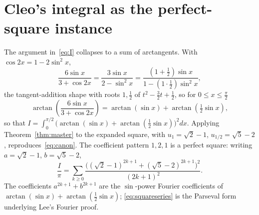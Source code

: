 \documentclass[11pt]{article}
\theoremstyle{plain}\newtheorem{theorem}{Theorem}\newtheorem{proposition}[theorem]{Proposition}
\theoremstyle{remark}\newtheorem{remark}[theorem]{Remark}
\begin{document}
\section{Cleo's integral as the perfect-square instance}\label{sec:square}
The argument in~\eqref{eq:I} collapses to a sum of arctangents. With $\cos2x=1-2\sin^2x$,
\[
  \frac{6\sin x}{3+\cos2x}=\frac{3\sin x}{2-\sin^2x}=\frac{(1+\tfrac12)\sin x}{1-(1\cdot\tfrac12)\sin^2x},
\]
the tangent-addition shape with roots $1,\tfrac12$ of $t^2-\tfrac32t+\tfrac12$, so for $0\le x\le\frac\pi2$
\begin{equation}\label{eq:collapse}
  \arctan\!\left(\frac{6\sin x}{3+\cos2x}\right)=\arctan(\sin x)+\arctan(\tfrac12\sin x),
\end{equation}
so that $I=\int_0^{\pi/2}\bigl(\arctan(\sin x)+\arctan(\tfrac12\sin x)\bigr)^2 dx$.
Applying Theorem~\ref{thm:master} to the expanded square, with $u_1=\sqrt2-1$, $u_{1/2}=\sqrt5-2$,
reproduces~\eqref{eq:canon}. The coefficient pattern $1,2,1$ is a perfect square: writing $a=\sqrt2-1$,
$b=\sqrt5-2$,
\begin{equation}\label{eq:squareseries}
  \frac{I}{\pi}=\sum_{k\ge0}\frac{\bigl((\sqrt2-1)^{2k+1}+(\sqrt5-2)^{2k+1}\bigr)^2}{(2k+1)^2}.
\end{equation}
The coefficients $a^{2k+1}+b^{2k+1}$ are the $\sin$-power Fourier coefficients of
$\arctan(\sin x)+\arctan(\tfrac12\sin x)$; \eqref{eq:squareseries} is the Parseval form underlying Lee's
Fourier proof.
\end{document}
